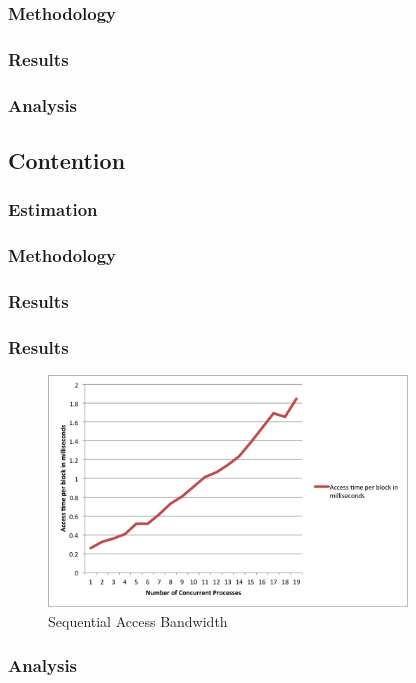 \subsubsection{Methodology}

\subsubsection{Results}

\subsubsection{Analysis}

\subsection{Contention}

\subsubsection{Estimation}

\subsubsection{Methodology}

\subsubsection{Results}

\subsubsection{Results}

\begin{figure}
 \centering
  \includegraphics[width=0.85\textwidth]{image/contention.png}
  \caption{Sequential Access Bandwidth}
 \label{fig:contention}
\end{figure}

\subsubsection{Analysis}
